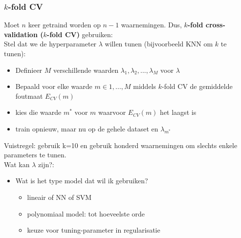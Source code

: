 {\subsubsection{$k$-fold CV}
Moet $n$ keer getraind worden op $n-1$ waarnemingen. Dus, \textbf{$k$-fold cross-validation ($k$-fold CV)} gebruiken:\\
Stel dat we de hyperparameter $\lambda$ willen tunen (bijvoorbeeld KNN om $k$ te tunen):
\begin{itemize}
    \item Definieer $M$ verschillende waarden $\lambda_1, \lambda_2,..., \lambda_M$ voor $\lambda$
    \item Bepaald voor elke waarde $m \in {1,...,M}$ middels $k$-fold CV de gemiddelde foutmaat $E_{CV}(m)$
    \item kies die waarde $m^*$ voor $m$ waarvoor $E_{CV}(m)$ het laagst is
    \item train opnieuw, maar nu op de gehele dataset en $\lambda_{m^*}$
\end{itemize}
Vuistregel: gebruik k=10 en gebruik honderd waarnemingen om slechts enkele parameters te tunen.\\

\noindent Wat kan $\lambda$ zijn?:
\begin{itemize}
    \item Wat is het type model dat wil ik gebruiken?
    \begin{itemize}
        \item lineair of NN of SVM
        \item polynomiaal model: tot hoeveelste orde
        \item keuze voor tuning-parameter in regularisatie
    \end{itemize}
\end{itemize}

}
